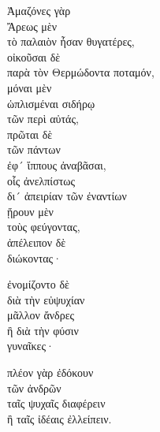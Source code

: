 {\large
\begin{greek}
\noindent Ἀμαζόνες γὰρ \\
\tabto{2em} Ἄρεως μὲν \\
\tabto{4em} τὸ παλαιὸν ἦσαν θυγατέρες, \\
\tabto{2em} οἰκοῦσαι δὲ \\
\tabto{4em} παρὰ τὸν Θερμώδοντα ποταμόν, \\
\tabto{2em} μόναι μὲν \\
\tabto{4em} ὡπλισμέναι σιδήρῳ \\
\tabto{6em} τῶν περὶ αὐτάς, \\
\tabto{2em} πρῶται δὲ \\
\tabto{4em} τῶν πάντων \\
\tabto{6em} ἐφ´ ἵππους ἀναβᾶσαι, \\
\tabto{8em} οἷς ἀνελπίστως \\
\tabto{8em} δι´ ἀπειρίαν τῶν ἐναντίων \\
\tabto{8em} ᾕρουν μὲν \\
\tabto{10em} τοὺς φεύγοντας, \\
\tabto{8em} ἀπέλειπον δὲ \\
\tabto{10em} διώκοντας·

ἐνομίζοντο δὲ \\
\tabto{2em} διὰ τὴν εὐψυχίαν \\
\tabto{4em} μᾶλλον ἄνδρες \\
\tabto{2em} ἢ διὰ τὴν φύσιν \\
\tabto{4em} γυναῖκες·

\tabto{2em} πλέον γὰρ ἐδόκουν \\
\tabto{4em} τῶν ἀνδρῶν \\
\tabto{6em} ταῖς ψυχαῖς διαφέρειν \\
\tabto{6em} ἢ ταῖς ἰδέαις ἐλλείπειν.\\

\end{greek}
}

